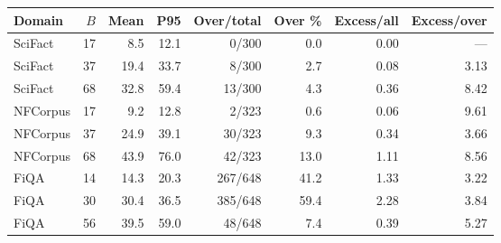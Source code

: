 \begin{tabular}{lrrrrrrr}
\toprule
Domain & $B$ & Mean & P95 & Over/total & Over \% & Excess/all & Excess/over \\
\midrule
SciFact & 17 & 8.5 & 12.1 & 0/300 & 0.0 & 0.00 & --- \\
SciFact & 37 & 19.4 & 33.7 & 8/300 & 2.7 & 0.08 & 3.13 \\
SciFact & 68 & 32.8 & 59.4 & 13/300 & 4.3 & 0.36 & 8.42 \\
NFCorpus & 17 & 9.2 & 12.8 & 2/323 & 0.6 & 0.06 & 9.61 \\
NFCorpus & 37 & 24.9 & 39.1 & 30/323 & 9.3 & 0.34 & 3.66 \\
NFCorpus & 68 & 43.9 & 76.0 & 42/323 & 13.0 & 1.11 & 8.56 \\
FiQA & 14 & 14.3 & 20.3 & 267/648 & 41.2 & 1.33 & 3.22 \\
FiQA & 30 & 30.4 & 36.5 & 385/648 & 59.4 & 2.28 & 3.84 \\
FiQA & 56 & 39.5 & 59.0 & 48/648 & 7.4 & 0.39 & 5.27 \\
\bottomrule
\end{tabular}
